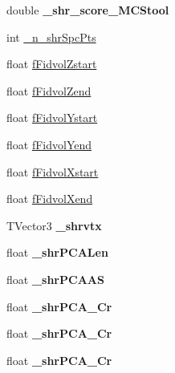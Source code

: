 \begin{DoxyCompactItemize}
\item 
double {\bfseries \+\_\+shr\+\_\+score\+\_\+\+M\+C\+Stool}\hypertarget{classanalysis_1_1MCS_a5249cd5b1a0f909fe330234d710f6944}{}\label{classanalysis_1_1MCS_a5249cd5b1a0f909fe330234d710f6944}

\item 
int \hyperlink{classanalysis_1_1MCS_ad27ca6658e7785da24b9267d54722d65}{\+\_\+n\+\_\+shr\+Spc\+Pts}
\item 
float \hyperlink{classanalysis_1_1MCS_a481348700b446db82180ca87424dfff5}{f\+Fidvol\+Zstart}
\item 
float \hyperlink{classanalysis_1_1MCS_a0f37e28d875d79342f586fb9de8be014}{f\+Fidvol\+Zend}
\item 
float \hyperlink{classanalysis_1_1MCS_aba2786d9cf1c4d8d7e0c3bd28d673cf5}{f\+Fidvol\+Ystart}
\item 
float \hyperlink{classanalysis_1_1MCS_af47987606cbc3ead8c1d88df48d49288}{f\+Fidvol\+Yend}
\item 
float \hyperlink{classanalysis_1_1MCS_af61ffe62b59b7f0eacca5603a1f4258e}{f\+Fidvol\+Xstart}
\item 
float \hyperlink{classanalysis_1_1MCS_aa92a82125d65dd78af1aaf113a5d133c}{f\+Fidvol\+Xend}
\item 
T\+Vector3 {\bfseries \+\_\+shrvtx}\hypertarget{classanalysis_1_1MCS_a195c578692a4006bed772952fd34e37d}{}\label{classanalysis_1_1MCS_a195c578692a4006bed772952fd34e37d}

\item 
float {\bfseries \+\_\+shr\+P\+C\+A\+Len}\hypertarget{classanalysis_1_1MCS_a22ce4abeaf1b74e6914c7e161f2fd1ab}{}\label{classanalysis_1_1MCS_a22ce4abeaf1b74e6914c7e161f2fd1ab}

\item 
float {\bfseries \+\_\+shr\+P\+C\+A\+AS}\hypertarget{classanalysis_1_1MCS_a91f0b06059fae3d97e56a12ef7b97554}{}\label{classanalysis_1_1MCS_a91f0b06059fae3d97e56a12ef7b97554}

\item 
float {\bfseries \+\_\+shr\+P\+C\+A\+\_\+Cr}\hypertarget{classanalysis_1_1MCS_a0dcccb32acb2744ab6b96356e09278ef}{}\label{classanalysis_1_1MCS_a0dcccb32acb2744ab6b96356e09278ef}

\item 
float {\bfseries \+\_\+shr\+P\+C\+A\+\_\+Cr}\hypertarget{classanalysis_1_1MCS_a6818934e71494c8af58188dbbd529e3a}{}\label{classanalysis_1_1MCS_a6818934e71494c8af58188dbbd529e3a}

\item 
float {\bfseries \+\_\+shr\+P\+C\+A\+\_\+Cr}\hypertarget{classanalysis_1_1MCS_ac7b9b7a6ec8ed5c2f07eea3650285d9c}{}\label{classanalysis_1_1MCS_ac7b9b7a6ec8ed5c2f07eea3650285d9c}


\end{DoxyCompactItemize}
